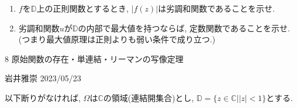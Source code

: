 \documentclass[dvipdfmx,a4paper,11pt]{article}
\newcommand{\C}{\mathbb{C}}
\newcommand{\D}{\mathbb{D}}
\theoremstyle{definition}
\begin{document}
\begin{enumerate}[label=\textbf{問}7.\arabic*]
   \begin{enumerate}
 \setlength{\parskip}{0cm} 
  \setlength{\itemsep}{0cm} 
  \item $f$を$\D$上の正則関数とするとき, $ |f(z)|$は劣調和関数であることを示せ.  %
  \item 劣調和関数$u$が$\D$の内部で最大値を持つならば, 定数関数であることを示せ. (つまり最大値原理は正則よりも弱い条件で成り立つ.)
      \end{enumerate}  
   
  \end{enumerate} 
 

\newpage


\begin{center}
{\Large 8 原始関数の存在・単連結・リーマンの写像定理}
\end{center}

\begin{flushright}
 岩井雅崇 2023/05/23
\end{flushright}
以下断りがなければ, $\Omega$は$\C$の領域(連結開集合)とし, $\D=\{z \in \C |  |z| <1\}$とする. 
\end{document}
